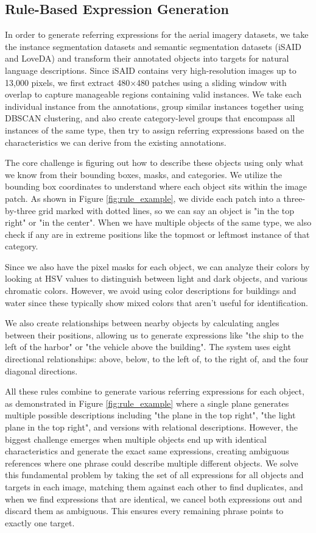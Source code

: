 \subsection{Rule-Based Expression Generation}

In order to generate referring expressions for the aerial imagery datasets, we take the instance segmentation datasets and semantic segmentation datasets (iSAID and LoveDA) and transform their annotated objects into targets for natural language descriptions. Since iSAID contains very high-resolution images up to 13,000 pixels, we first extract 480×480 patches using a sliding window with overlap to capture manageable regions containing valid instances. We take each individual instance from the annotations, group similar instances together using DBSCAN clustering, and also create category-level groups that encompass all instances of the same type, then try to assign referring expressions based on the characteristics we can derive from the existing annotations.

The core challenge is figuring out how to describe these objects using only what we know from their bounding boxes, masks, and categories. We utilize the bounding box coordinates to understand where each object sits within the image patch. As shown in Figure \ref{fig:rule_example}, we divide each patch into a three-by-three grid marked with dotted lines, so we can say an object is "in the top right" or "in the center". When we have multiple objects of the same type, we also check if any are in extreme positions like the topmost or leftmost instance of that category.

Since we also have the pixel masks for each object, we can analyze their colors by looking at HSV values to distinguish between light and dark objects, and various chromatic colors. However, we avoid using color descriptions for buildings and water since these typically show mixed colors that aren't useful for identification.

We also create relationships between nearby objects by calculating angles between their positions, allowing us to generate expressions like "the ship to the left of the harbor" or "the vehicle above the building". The system uses eight directional relationships: above, below, to the left of, to the right of, and the four diagonal directions.

All these rules combine to generate various referring expressions for each object, as demonstrated in Figure \ref{fig:rule_example} where a single plane generates multiple possible descriptions including "the plane in the top right", "the light plane in the top right", and versions with relational descriptions. However, the biggest challenge emerges when multiple objects end up with identical characteristics and generate the exact same expressions, creating ambiguous references where one phrase could describe multiple different objects. We solve this fundamental problem by taking the set of all expressions for all objects and targets in each image, matching them against each other to find duplicates, and when we find expressions that are identical, we cancel both expressions out and discard them as ambiguous. This ensures every remaining phrase points to exactly one target.

